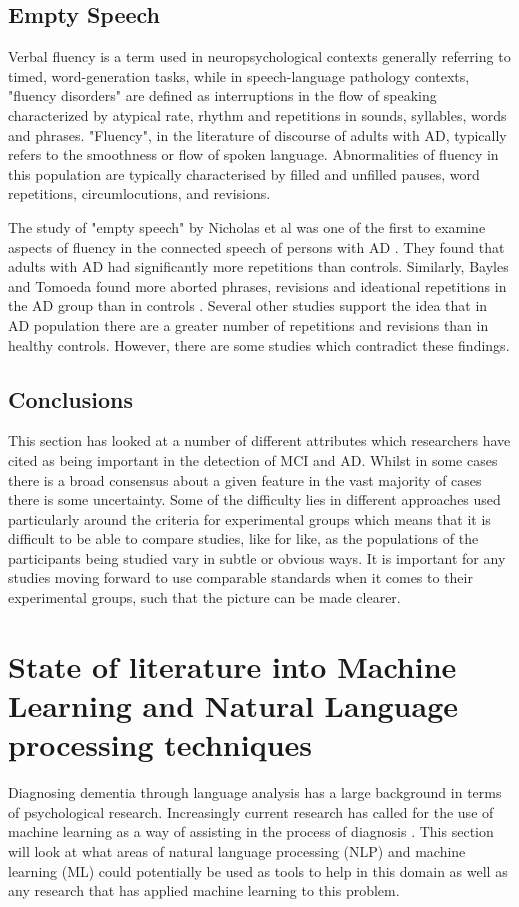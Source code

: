 \documentclass[10pt, letterpaper, twoside, openany]{book}
\begin{document}
\subsection{Empty Speech}
Verbal fluency is a term used in neuropsychological contexts generally referring to timed, word-generation tasks, while in speech-language pathology contexts, "fluency disorders" are defined as interruptions in the flow of speaking characterized by atypical rate, rhythm and repetitions in sounds, syllables, words and phrases. "Fluency", in the literature of discourse of adults with AD, typically refers to the smoothness or flow of spoken language. Abnormalities of fluency in this population are typically characterised by filled and unfilled pauses, word repetitions, circumlocutions, and revisions.
\par
The study of "empty speech" by Nicholas et al was one of the first to examine aspects of fluency in the connected speech of persons with AD \cite{Nicholas1985}. They found that adults with AD had significantly more repetitions than controls. Similarly, Bayles and Tomoeda found more aborted phrases, revisions and ideational repetitions in the AD group than in controls \cite{Bayles1983}. Several other studies support the idea that in AD population there are a greater number of repetitions and revisions than in healthy controls. However, there are some studies which contradict these findings\cite{Ahmed2013}.
\subsection{Conclusions}
This section has looked at a number of different attributes which researchers have cited as being important in the detection of MCI and AD. Whilst in some cases there is a broad consensus about a given feature in the vast majority of cases there is some uncertainty. Some of the difficulty lies in different approaches used particularly around the criteria for experimental groups which means that it is difficult to be able to compare studies, like for like, as the populations of the participants being studied vary in subtle or obvious ways. It is important for any studies moving forward to use comparable standards when it comes to their experimental groups, such that the picture can be made clearer.

\section{State of literature into Machine Learning and Natural Language processing techniques}
Diagnosing dementia through language analysis has a large background in terms of psychological research. Increasingly current research has called for the use of machine learning as a way of assisting in the process of diagnosis \cite{Orimaye2017, Boschi2017}. This section will look at what areas of natural language processing (NLP) and machine learning (ML) could potentially be used as tools to help in this domain as well as any research that has applied machine learning to this problem.
\end{document}
